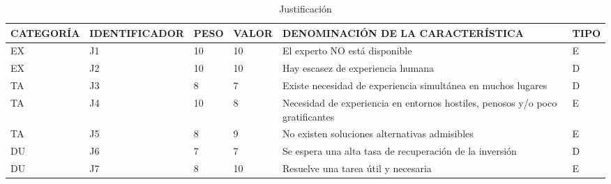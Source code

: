 \documentclass[a4paper,12pt]{article}
\begin{document}
\begin{table}[h]
	\centering
	\begin{tabular}{|l|l|l|l|p{4cm}|l|}
		\hline
		\scriptsize CATEGORÍA & \scriptsize IDENTIFICADOR & \scriptsize PESO & \scriptsize VALOR & \scriptsize DENOMINACIÓN DE LA CARACTERÍSTICA                                 & \scriptsize TIPO \\ \hline
		EX                    & J1                        & 10               & 10                & El experto NO está disponible                                                 & E                \\ \hline
		EX                    & J2                        & 10               & 10                & Hay escasez de experiencia humana                                             & D                \\ \hline
		TA                    & J3                        & 8                & 7                 & Existe necesidad de experiencia simultánea en muchos lugares                  & D                \\ \hline
		TA                    & J4                        & 10               & 8                 & Necesidad de experiencia en entornos hostiles, penosos y/o poco gratificantes & E                \\ \hline
		TA                    & J5                        & 8                & 9                 & No existen soluciones alternativas admisibles                                 & E                \\ \hline
		DU                    & J6                        & 7                & 7                 & Se espera una alta tasa de recuperación de la inversión                       & D                \\ \hline
		DU                    & J7                        & 8                & 10                & Resuelve una tarea útil y necesaria                                           & E                \\ \hline
	\end{tabular}
	\caption{Justificación}
	\label{tab:justificacion}
\end{table}
\end{document}
